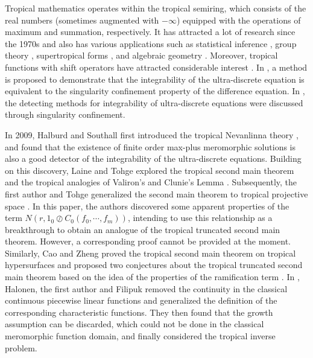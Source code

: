 \documentclass{article}
\begin{document}
Tropical mathematics operates within the tropical semiring, which consists of the real numbers (sometimes augmented with $-\infty$) equipped with the operations of maximum and summation, respectively. It has attracted a lot of research since the 1970s \cite{Min} and also has various applications such as statistical inference \cite{Sta}, group theory \cite{Gro}, supertropical forms \cite{Izh1, Izh2, Izh3}, and algebraic geometry \cite{Geo, Enu}. Moreover, tropical functions with shift operators have attracted considerable interest \cite{Upa}. In \cite{How}, a method is proposed to demonstrate that the integrability of the ultra-discrete equation is equivalent to the singularity confinement property of the difference equation. In \cite{Cel}, the detecting methods for integrability of ultra-discrete equations were discussed through singularity confinement.

In 2009, Halburd and Southall first introduced the tropical Nevanlinna theory \cite{Tnt}, and found that the existence of finite order max-plus meromorphic solutions is also a good detector of the integrability of the ultra-discrete equations. Building on this discovery, Laine and Tohge explored the tropical second main theorem and the tropical analogies of Valiron's and Clunie's Lemma \cite{Secm, Clu}. Subsequently, the first author and Tohge generalized the second main theorem to tropical projective space \cite{Pro}. In this paper, the authors discovered some apparent properties of the term $N(r, 1_{0}\oslash C_{0}(f_{0}, \cdots, f_{m}))$, intending to use this relationship as a breakthrough to obtain an analogue of the tropical truncated second main theorem. However, a corresponding proof cannot be provided at the moment. Similarly, Cao and Zheng proved the tropical second main theorem on tropical hypersurfaces and proposed two conjectures about the tropical truncated second main theorem based on the idea of the properties of the ramification term \cite{Thyp}. In \cite{Tnp}, Halonen, the first author and Filipuk removed the continuity in the classical continuous piecewise linear functions and generalized the definition of the corresponding characteristic functions. They then found that the growth assumption can be discarded, which could not be done in the classical meromorphic function domain, and finally considered the tropical inverse problem.
\end{document}
